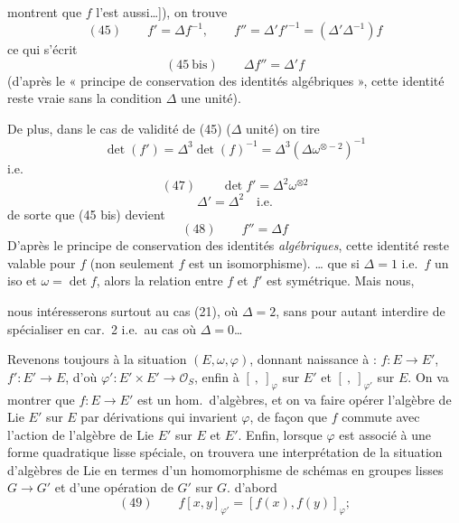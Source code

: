 \documentclass[11pt,a4paper]{article}
\begin{document}
montrent que $f$ l'est aussi\ldots]), \ill{} on trouve
\[
  (45) \qquad f' = \Delta f^{-1} , \qquad f'' = \Delta' f'^{-1} = (\Delta'\Delta^{-1}) f
\]
ce qui s'écrit
\[
  (45\ \text{bis}) \qquad \Delta f'' = \Delta' f
\]
(d'après le « principe de conservation des identités algébriques », cette
identité reste vraie sans la condition \struck{\ill{}} $\Delta$ une unité).

De plus, dans le cas de validité de (45) ($\Delta$ unité) on tire
\[
  \det(f') = \Delta^3 \det(f)^{-1} = \Delta^3 (\Delta\omega^{\otimes -2})^{-1}
\]
i.e.
\[
  (47) \qquad \det f' = \Delta^2 \omega^{\otimes 2}
\]
\[
  \Delta' = \Delta^2 \quad \text{i.e.}
\]
\struck{\ill{}} de sorte que (45 bis) devient
\[
  (48) \qquad f'' = \Delta f
\]
D'après le principe de conservation des identités \emph{algébriques}, cette
identité reste valable pour  $f$ (non seulement  $f$
est un isomorphisme).  \struck{\ill{}}  \ldots{} que
si $\Delta = 1$ i.e.\ $f$ un iso et $\omega = \det f$, alors la relation entre $f$ et
$f'$ est symétrique. Mais nous,

nous intéresserons surtout au cas (21), où $\Delta = 2$, sans pour autant
interdire de spécialiser en car.\ 2 i.e.\ au cas où $\Delta = 0$\ldots

Revenons toujours à la situation $(E, \omega, \varphi)$, donnant naissance à :
$f : E \to E'$, $f' : E' \to E$, d'où $\varphi' : E' \times E' \to \mathcal{O}_S$,
enfin à $[\ ,\ ]_{\varphi}$ sur $E'$ et $[\ ,\ ]_{\varphi'}$ sur $E$. On va montrer
que $f : E \to E'$ est un hom.\ d'algèbres, et  on va
faire opérer l'algèbre de Lie $E'$ sur $E$ par dérivations  qui
invarient $\varphi$, de façon que $f$ commute avec l'action de l'algèbre de Lie $E'$
sur $E$ et $E'$. Enfin, lorsque $\varphi$  est associé à une
forme quadratique lisse spéciale, on trouvera une interprétation de la situation
d'algèbres de Lie en termes d'un homomorphisme de schémas en groupes lisses
$G \to G'$ et d'une opération de $G'$ sur $G$.  
d'abord
\[
  (49) \qquad f[x, y]_{\varphi'} = [f(x), f(y)]_{\varphi} ;
\]
\end{document}
